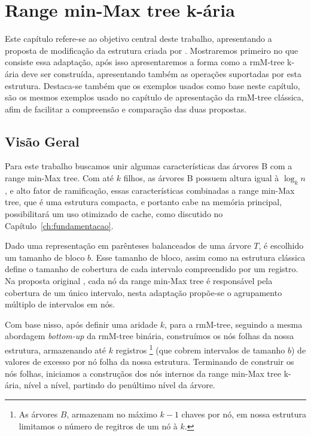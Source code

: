 \chapter{Range min-Max tree k-ária}
\label{chp:desenvolvimento}
Este capítulo refere-se ao objetivo central deste trabalho, apresentando a proposta de modificação da estrutura criada por \cite{paper-fully-functinal-succint-trees}. Mostraremos primeiro no que consiste essa adaptação, após isso apresentaremos a forma como a rmM-tree k-ária deve ser construída, apresentando também as operações suportadas por esta estrutura. 
Destaca-se também que os exemplos usados como base neste capítulo, são os mesmos exemplos usado no capítulo de apresentação da rmM-tree clássica, afim de facilitar a compreensão e comparação das duas propostas.

\section{Visão Geral}
Para este trabalho buscamos unir algumas características das árvores B com a range min-Max tree. Com até $k$ filhos, as árvores B possuem altura igual à $\log_k n$, e alto fator de ramificação, essas características combinadas a range min-Max tree, que é uma estrutura compacta, e portanto cabe na memória principal, possibilitará um uso otimizado de cache, como discutido no Capítulo~\ref{ch:fundamentacao}.

Dado uma representação em parênteses balanceados de uma árvore $T$, é escolhido um tamanho de bloco $b$. Esse tamanho de bloco, assim como na estrutura clássica define o tamanho de cobertura de cada intervalo compreendido por um registro.  Na proposta original \citet{paper-fully-functinal-succint-trees}, cada nó da range min-Max tree é responsável pela cobertura de um único intervalo, nesta adaptação propõe-se o agrupamento múltiplo de intervalos em nós.

Com base nisso, após definir uma aridade $k$, para a rmM-tree, seguindo a mesma abordagem \textit{bottom-up} da rmM-tree binária, construímos os nós folhas da nossa estrutura, armazenando até $k$ registros  \footnote{As árvores $B$, armazenam no máximo $k-1$ chaves por nó, em nossa estrutura limitamos o número de regitros de um nó à $k$.} (que cobrem intervalos de tamanho $b$) de valores de excesso por nó folha da nossa estrutura. Terminando de construir os nós folhas, iniciamos a construçãos dos nós internos da range min-Max tree k-ária, nível a nível, partindo do penúltimo nível da árvore. 

